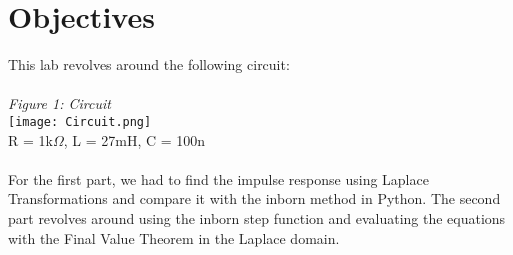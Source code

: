 \documentclass[12pt,a4paper]{article}
\begin{document}
\section{Objectives}\label{sec:intro}
This lab revolves around the following circuit:\\
\\
\textit{Figure 1: Circuit}
\\
\texttt{[image: Circuit.png]}
\\
R = 1k$\Omega$, L = 27mH, C = 100n\\
\\
For the first part, we had to find the impulse response using Laplace Transformations and compare it with the inborn method in Python. The second part revolves around using the inborn step function and evaluating the equations with the Final Value Theorem in the Laplace domain.\\
\end{document}
